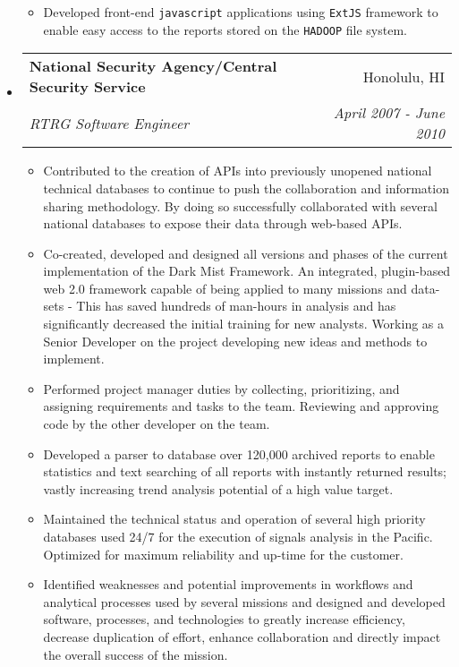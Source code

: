 \documentclass[letterpaper,13pt]{article}
\makeatletter
\newcommand{\resitem}[1]{\item #1 \vspace{-2pt}}
\newcommand{\ressubheading}[4]{

\begin{tabular*}{6.5in}{l@{\cftdotfill{\cftsecdotsep}\extracolsep{\fill}}r}

		\textbf{#1} & #2 \\

		\textit{#3} & \textit{#4} \\

\end{tabular*}\vspace{-4pt}}
\makeatother
\begin{document}
\begin{itemize}
\begin{itemize}
		\resitem{Developed front-end \texttt{javascript} applications using \texttt{ExtJS} framework to enable easy access to the reports stored on the \texttt{HADOOP} file system.}

	\end{itemize}
	
\item

	\ressubheading{National Security Agency/Central Security Service}{Honolulu, HI}{RTRG Software Engineer}{April 2007 - June 2010}

	\begin{itemize}

		\resitem{Contributed to the creation of APIs into previously unopened national technical databases to continue to push the collaboration and information sharing methodology. By doing so successfully collaborated with several national databases to expose their data through web-based APIs.}
		
		\resitem{Co-created, developed and designed all versions and phases of the current implementation of the Dark Mist Framework. An integrated, plugin-based web 2.0 framework capable of being applied to many missions and data-sets - This has saved hundreds of man-hours in analysis and has significantly decreased the initial training for new analysts. Working as a Senior Developer on the project developing new ideas and methods to implement.}

		\resitem{Performed project manager duties by collecting, prioritizing, and assigning requirements and tasks to the team. Reviewing and approving code by the other developer on the team.}
		
		\resitem{Developed a parser to database over 120,000 archived reports to enable statistics and text searching of all reports with instantly returned results; vastly increasing trend analysis potential of a high value target.}
		
		\resitem{Maintained the technical status and operation of several high priority databases used 24/7 for the execution of signals analysis in the Pacific. Optimized for maximum reliability and up-time for the customer.}
		
		\resitem{Identified weaknesses and potential improvements in workflows and analytical processes used by several missions and designed and developed software, processes, and technologies to greatly increase efficiency, decrease duplication of effort, enhance collaboration and directly impact the overall success of the mission.}
		
	\end{itemize}

\end{itemize}
\end{document}
